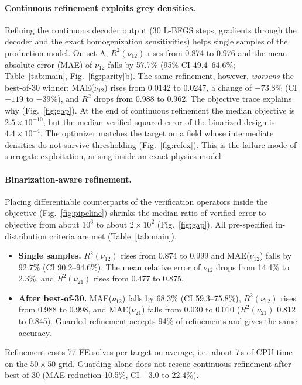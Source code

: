 \documentclass[a4paper,11pt]{article}
\newcommand{\nuot}{\nu_{12}}
\newcommand{\nuto}{\nu_{21}}
\newcommand{\RR}{R^2}
\begin{document}
\paragraph{Continuous refinement exploits grey densities.}
Refining the continuous decoder output (30 L-BFGS steps, gradients through
the decoder and the exact homogenization sensitivities) helps single samples
of the production model. On set A, $\RR(\nuot)$ rises from 0.874 to 0.976
and the mean absolute error (MAE) of $\nuot$ falls by 57.7\% (95\% CI
49.4--64.6\%; Table~\ref{tab:main}, Fig.~\ref{fig:parity}b). The same
refinement, however, \emph{worsens} the best-of-30 winner: MAE($\nuot$)
rises from 0.0142 to 0.0247, a change of $-73.8\%$ (CI $-119$ to $-39\%$),
and $\RR$ drops from 0.988 to 0.962. The objective trace explains why
(Fig.~\ref{fig:gap}). At the end of continuous refinement the median
objective is $2.5\times10^{-10}$, but the median verified squared error of
the binarized design is $4.4\times10^{-4}$. The optimizer matches the target
on a field whose intermediate densities do not survive thresholding
(Fig.~\ref{fig:refex}). This is the failure mode of surrogate exploitation,
arising inside an exact physics model.

\paragraph{Binarization-aware refinement.}
Placing differentiable counterparts of the verification operators inside the
objective (Fig.~\ref{fig:pipeline}) shrinks the median ratio of verified
error to objective from about $10^{6}$ to about $2\times10^{2}$
(Fig.~\ref{fig:gap}). All pre-specified in-distribution criteria are met
(Table~\ref{tab:main}).
\begin{itemize}
\item \textbf{Single samples.} $\RR(\nuot)$ rises from 0.874 to 0.999 and
MAE($\nuot$) falls by 92.7\% (CI 90.2--94.6\%). The mean relative error of
$\nuot$ drops from 14.4\% to 2.3\%, and $\RR(\nuto)$ rises from 0.477 to
0.875.
\item \textbf{After best-of-30.} MAE($\nuot$) falls by 68.3\% (CI
59.3--75.8\%), $\RR(\nuot)$ rises from 0.988 to 0.998, and MAE($\nuto$)
falls from 0.030 to 0.010 ($\RR(\nuto)$ 0.812 to 0.845). Guarded refinement
accepts 94\% of refinements and gives the same accuracy.
\end{itemize}
Refinement costs 77 FE solves per target on average, i.e.\ about 7\,s of
CPU time on the $50\times50$ grid. Guarding alone does not rescue continuous
refinement after best-of-30 (MAE reduction 10.5\%, CI $-3.0$ to 22.4\%).
\end{document}
